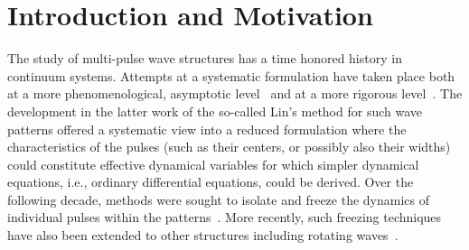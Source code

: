 \documentclass[12pt]{article}
\begin{document}
\begin{abstract}
    In the present work we revisit the existence 
    of multi-pulse solutions in discrete systems.
    We provide a general framework for the study
    of such wave patterns based on a discrete
    analogue of Lin's method previously used in
    the continuum realm. We develop explicit conditions
    for the existence of $m$-pulse structures and
    subsequently develop a reduced matrix allowing to
    address their spectral stability. As a prototypical
    example for the manifestation of the details of
    the formulation, we consider the discrete nonlinear
    Schr{\"o}dinger equation. Different families
    of $2$- and $3$-pulse solitary waves are discussed
    and analytical expressions for the corresponding 
    stability eigenvalues obtained in very good agreement
    with numerical results. The systematic continuation of
    the families of solutions over the inter-site coupling is explored numerically 
    corroborating the analytical results.
    \end{abstract}

\section{Introduction and Motivation}

The study of multi-pulse wave structures has a time
honored history in continuum systems. Attempts at
a systematic formulation have taken place both at
a more phenomenological, asymptotic level~\cite{elphick}
and at a more rigorous level~\cite{Sandstede1998}.
The development in the latter work of the so-called
Lin's method for such wave patterns offered a 
systematic view into a reduced formulation where
the characteristics of the pulses (such as their centers,
or possibly also their widths) could constitute effective
dynamical variables for which simpler dynamical equations,
i.e., ordinary differential equations, could be derived.
Over the following decade, methods were sought to 
isolate and freeze the dynamics of individual pulses
within the patterns~\cite{beyn1,beyn2}. More recently,
such freezing techniques have also been extended to other
structures including rotating waves~\cite{beyn3}. 
\end{document}
